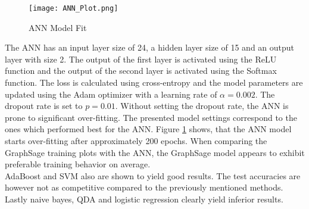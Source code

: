   \begin{figure}[h]
		\centering
		\texttt{[image: ANN\_Plot.png]}
		\caption{ANN Model Fit}
        \label{fig:ANN_fit}
  \end{figure}

  \newpage
  \noindent The ANN has an input layer size of 24, a hidden layer size of 15
  and an output layer with size 2. The output of the first layer is activated
  using the ReLU function and the output of the second layer is activated
  using the Softmax function. The loss is calculated using cross-entropy and
  the model parameters are updated using the Adam optimizer with a learning
  rate of $\alpha=0.002$. The dropout rate is set to $p=0.01$. Without setting 
  the dropout rate, the ANN is prone to significant over-fitting. The presented 
  model settings correspond to the ones which performed best for the ANN. Figure 
  \ref{fig:ANN_fit} shows, that the ANN model starts over-fitting after 
  approximately 200 epochs. When comparing the GraphSage training plots with the 
  ANN, the GraphSage model appears to exhibit preferable training behavior on
  average. \\

  \noindent AdaBoost and SVM also are shown to yield good results. The test
  accuracies are however not as competitive compared to the previously
  mentioned methods. Lastly naive bayes, QDA and logistic regression clearly
  yield inferior results. 
